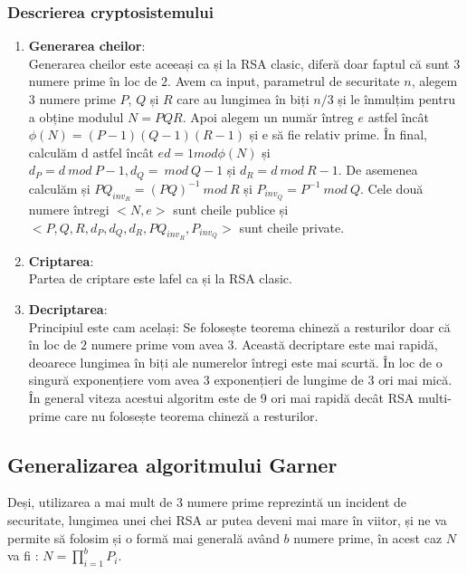 \documentclass[12]{report}
\begin{document}
		 \subsubsection{Descrierea cryptosistemului}
		 \begin{enumerate}
		  \item \textbf{Generarea cheilor}: \\
		  Generarea cheilor este aceeași ca și la RSA clasic, diferă doar faptul că sunt $3$ numere prime în loc de $2$. Avem ca input, parametrul de securitate $n$, alegem 3 numere prime $P$, $Q$ și $R$ care au lungimea în biți $n/3$ și le înmulțim pentru a obține modulul $N=PQR$. Apoi alegem un număr întreg $e$ astfel încât $\phi(N)=(P-1)(Q-1)(R-1)$ și e să fie relativ prime. În final, calculăm d astfel încât $ed=1 mod \phi(N)$ și $d_P=d \ mod \ P-1, d_Q= \ mod \ Q-1$ și $d_R=d \ mod \ R-1$. De asemenea calculăm și $PQ_{inv_R}=(PQ)^{-1} \ mod \ R$ și $P_{inv_Q}=P^{-1} \ mod \ Q$. Cele două numere întregi $<N,e>$ sunt cheile publice și $<P,Q,R,d_P,d_Q,d_R,PQ_{inv_R},P_{inv_Q}>$ sunt cheile private.
		  
		  \item \textbf{Criptarea}: \\
		  Partea de criptare este lafel ca și la RSA clasic.
		  
		  \item \textbf{Decriptarea}: \\
		  Principiul este cam același: Se folosește teorema chineză a resturilor doar că în loc de $2$ numere prime vom avea $3$. Această decriptare este mai rapidă, deoarece lungimea în biți ale numerelor întregi este mai scurtă. În loc de o singură exponențiere vom avea 3 exponențieri de lungime de 3 ori mai mică. În general viteza acestui algoritm este de 9 ori mai rapidă decât RSA multi-prime care nu folosește teorema chineză a resturilor.
		  
		 \end{enumerate}
		 
		 \subsection{Generalizarea algoritmului Garner}
		 Deși, utilizarea a mai mult de $3$ numere prime reprezintă un incident de securitate, lungimea unei chei RSA ar putea deveni mai mare în viitor, și ne va permite să folosim și o formă mai generală având $b$ numere prime, în acest caz $N$ va fi : $N=\prod_{i=1}^{b} P_i$.
\end{document}
